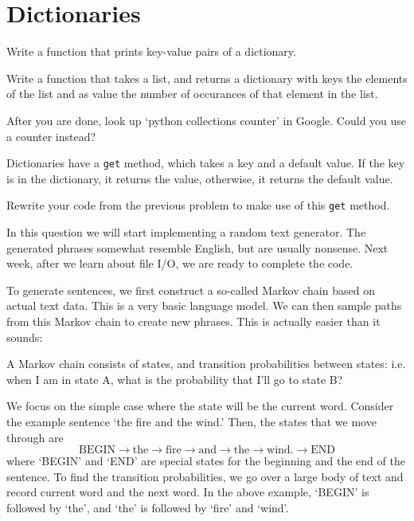 \section{Dictionaries} %
\label{sec:dictionaries}
\begin{questions}
\label{sub:printing_a_dictionary}

Write a function that prints key-value pairs of a dictionary.


\label{sub:histogram}

Write a function that takes a list, and returns a dictionary with
keys the elements of the list and as value the number of occurances of
that element in the list.

After you are done, look up `python collections counter' in Google.
Could you use a counter instead?


\label{sub:get_method}

Dictionaries have a \texttt{get} method, which takes a key and a default value.
If the key is in the dictionary, it returns the value, otherwise, it returns the
default value.

Rewrite your code from the previous problem to make use of this \texttt{get} method.


\label{sub:random_text_generator}

In this question we will start implementing a random text generator.
The generated phrases somewhat resemble English, but are usually nonsense.
Next week, after we learn about file I/O, we are ready to complete the code.

To generate sentences, we first construct a so-called Markov chain based on actual text data.
This is a very basic language model.
We can then sample paths from this Markov chain to create new phrases.
This is actually easier than it sounds:

A Markov chain consists of states, and transition probabilities between states:
i.e. when I am in state A, what is the probability that I'll go to state B?

We focus on the simple case where the state will be the current word.
Consider the example sentence `the fire and the wind.'
Then, the states that we move through are
\[
    \text{BEGIN} \to \text{the} \to \text{fire} \to \text{and} \to \text{the} \to \text{wind.} \to \text{END}
\]
where `BEGIN' and `END' are special states for the beginning and the end of the sentence.
To find the transition probabilities, we go over a large body of text and
record current word and the next word.
In the above example, `BEGIN' is followed by `the', and `the' is followed by
`fire' and `wind'.


\end{questions}
